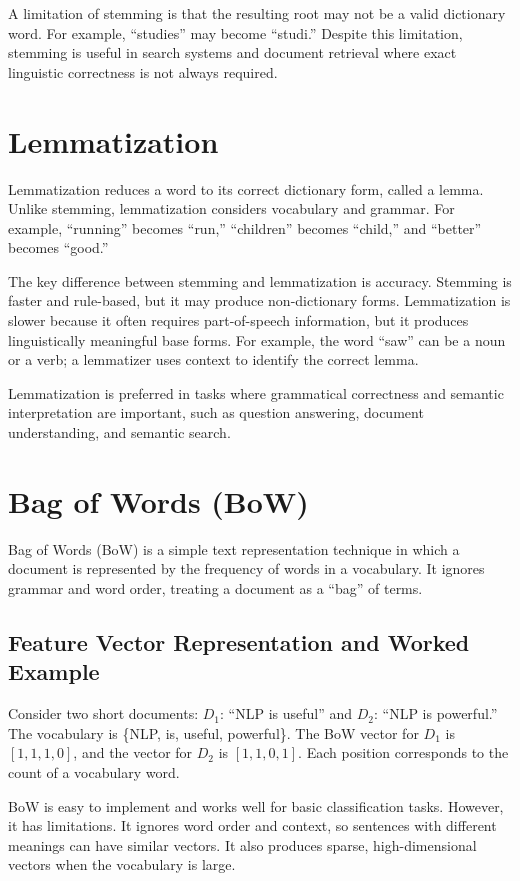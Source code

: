 \documentclass[10pt]{article}
\begin{document}
A limitation of stemming is that the resulting root may not be a valid dictionary word. For example, ``studies'' may become ``studi.'' Despite this limitation, stemming is useful in search systems and document retrieval where exact linguistic correctness is not always required.

\section{Lemmatization}

Lemmatization reduces a word to its correct dictionary form, called a lemma. Unlike stemming, lemmatization considers vocabulary and grammar. For example, ``running'' becomes ``run,'' ``children'' becomes ``child,'' and ``better'' becomes ``good.''

The key difference between stemming and lemmatization is accuracy. Stemming is faster and rule-based, but it may produce non-dictionary forms. Lemmatization is slower because it often requires part-of-speech information, but it produces linguistically meaningful base forms. For example, the word ``saw'' can be a noun or a verb; a lemmatizer uses context to identify the correct lemma.

Lemmatization is preferred in tasks where grammatical correctness and semantic interpretation are important, such as question answering, document understanding, and semantic search.

\section{Bag of Words (BoW)}

Bag of Words (BoW) is a simple text representation technique in which a document is represented by the frequency of words in a vocabulary. It ignores grammar and word order, treating a document as a ``bag'' of terms.

\subsection{Feature Vector Representation and Worked Example}

Consider two short documents: $D_1$: ``NLP is useful'' and $D_2$: ``NLP is powerful.'' The vocabulary is \{NLP, is, useful, powerful\}. The BoW vector for $D_1$ is $[1,1,1,0]$, and the vector for $D_2$ is $[1,1,0,1]$. Each position corresponds to the count of a vocabulary word.

BoW is easy to implement and works well for basic classification tasks. However, it has limitations. It ignores word order and context, so sentences with different meanings can have similar vectors. It also produces sparse, high-dimensional vectors when the vocabulary is large.
\end{document}
